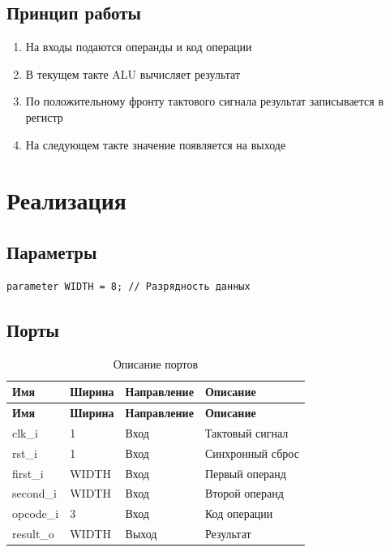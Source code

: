 \documentclass[a4paper,12pt]{article}
\begin{document}
\subsection{Принцип работы}
\begin{enumerate}
    \item На входы подаются операнды и код операции
    \item В текущем такте ALU вычисляет результат
    \item По положительному фронту тактового сигнала результат записывается в регистр
    \item На следующем такте значение появляется на выходе
\end{enumerate}

\section{Реализация}
\subsection{Параметры}
\begin{lstlisting}[style=verilog]
parameter WIDTH = 8; // Разрядность данных
\end{lstlisting}

\subsection{Порты}
\begin{longtable}{|l|l|l|l|}
\caption{Описание портов}\\
\hline
\textbf{Имя} & \textbf{Ширина} & \textbf{Направление} & \textbf{Описание} \\ \hline
\endfirsthead
\hline
\textbf{Имя} & \textbf{Ширина} & \textbf{Направление} & \textbf{Описание} \\ \hline
\endhead
\hline
\endfoot
clk\_i & 1 & Вход & Тактовый сигнал \\ \hline
rst\_i & 1 & Вход & Синхронный сброс \\ \hline
first\_i & WIDTH & Вход & Первый операнд \\ \hline
second\_i & WIDTH & Вход & Второй операнд \\ \hline
opcode\_i & 3 & Вход & Код операции \\ \hline
result\_o & WIDTH & Выход & Результат \\ \hline
\end{longtable}
\end{document}
